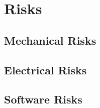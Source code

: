 
\section{Risks}
\label{sec:risks}


\subsection{Mechanical Risks}


\subsection{Electrical Risks}


\subsection{Software Risks}

